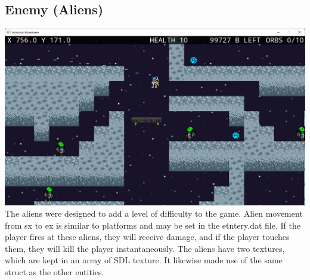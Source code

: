 \subsection{Enemy (Aliens)}
\includegraphics[width=1\linewidth]{images/ss3.png}
The aliens were designed to add a level of difficulty to the game. Alien movement from sx to ex is similar to platforms and may be set in the etntery.dat file. If the player fires at these aliens, they will receive damage, and if the player touches them, they will kill the player instantaneously. The aliens have two textures, which are kept in an array of SDL texture. It likewise made use of the same struct as the other entities. 

  